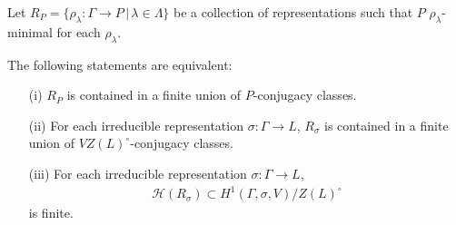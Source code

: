 \begin{lemma}
  Let $R_P = \{\rho_\lambda:\Gamma\rightarrow P\,|\,\lambda\in\Lambda\}$ be a collection of representations such that $P$ $\rho_\lambda$-minimal for each $\rho_\lambda$.
  
  The following statements are equivalent:
  \begin{itemize}
    \item[(i)] $R_P$ is contained in a finite union of $P$-conjugacy classes.
    \item[(ii)] For each irreducible representation $\sigma:\Gamma\rightarrow L$, $R_{\sigma}$ is contained in a finite union of $VZ(L)^\circ$-conjugacy classes.
    \item[(iii)] For each irreducible representation $\sigma:\Gamma\rightarrow L$,
      \begin{align*}
	\mathcal{H}(R_{\sigma}) \subset H^{1}(\Gamma,\sigma,V)/Z(L)^\circ
      \end{align*}
      is finite.
  \end{itemize}
  \label{lem:p_h1}
\end{lemma}
